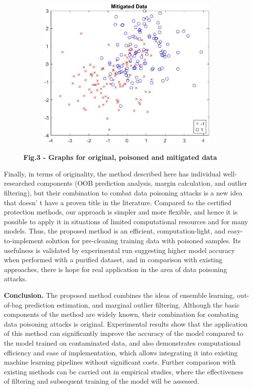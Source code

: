 \begin{figure}[H]
\begin{subfigure}[t]{0.45\textwidth}
        \centering
        \includegraphics[width=\textwidth]{media/ict2/image228}
    \end{subfigure}
    \caption*{{\bfseries Fig.3 - Graphs for original, poisoned and mitigated data}}
\end{figure}

\begin{multicols}{2}
Finally, in terms of originality, the method described here has
individual well-researched components (OOB prediction analysis, margin
calculation, and outlier filtering), but their combination to combat
data poisoning attacks is a new idea that doesn' t have a
proven title in the literature. Compared to the certified protection
methods, our approach is simpler and more flexible, and hence it is
possible to apply it in situations of limited computational resources
and for many models. Thus, the proposed method is an efficient,
computation-light, and easy-to-implement solution for pre-cleaning
training data with poisoned samples. Its usefulness is validated by
experimental run suggesting higher model accuracy when performed with a
purified dataset, and in comparison with existing approaches, there is
hope for real application in the area of data poisoning attacks.

{\bfseries Conclusion.} The proposed method combines the ideas of ensemble
learning, out-of-bag prediction estimation, and marginal outlier
filtering. Although the basic components of the method are widely known,
their combination for combating data poisoning attacks is original.
Experimental results show that the application of this method can
significantly improve the accuracy of the model compared to the model
trained on contaminated data, and also demonstrates computational
efficiency and ease of implementation, which allows integrating it into
existing machine learning pipelines without significant costs. Further
comparison with existing methods can be carried out in empirical
studies, where the effectiveness of filtering and subsequent training of
the model will be assessed.
\end{multicols}

